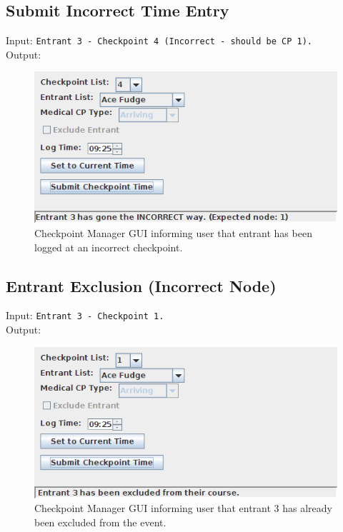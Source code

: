 \documentclass[a4paper, 10pt]{article}
\begin{document}
\subsection{Submit Incorrect Time Entry}

Input: \verb+Entrant 3 - Checkpoint 4 (Incorrect - should be CP 1).+ \\

Output:
\begin{figure}[ht!]
\centering
\includegraphics[scale=0.7]{cm-submitincorrect.png}
\caption{Checkpoint Manager GUI informing user that entrant has been logged at an incorrect checkpoint.}
\end{figure}

\subsection{Entrant Exclusion (Incorrect Node)}

Input: \verb+Entrant 3 - Checkpoint 1.+ \\

Output:
\begin{figure}[ht!]
\centering
\includegraphics[scale=0.7]{cm-submitexclude.png}
\caption{Checkpoint Manager GUI informing user that entrant 3 has already been excluded from the event.}
\end{figure}
\end{document}
